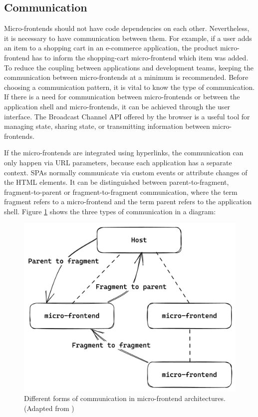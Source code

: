 \subsection{Communication}\label{subsection:background:micro-frontend:communication-patterns}

Micro-frontends should not have code dependencies on each other. Nevertheless, it is necessary to have communication between them. For example, if a user adds an item to a shopping cart in an e-commerce application, the product micro-frontend has to inform the shopping-cart micro-frontend which item was added. To reduce the coupling between applications and development teams, keeping the communication between micro-frontends at a minimum is recommended. Before choosing a communication pattern, it is vital to know the type of communication. If there is a need for communication between micro-frontends or between the application shell and micro-frontends, it can be achieved through the user interface. \cite{book:2020:geers:background:micro-frontends:micro-frontends-in-action} The Broadcast Channel \ac{API} offered by the browser is a useful tool for managing state, sharing state, or transmitting information between micro-frontends. \cite{misc:-:background:micro-frontends:broadcast-channel-api} 

\bigskip

\noindent If the micro-frontends are integrated using hyperlinks, the communication can only happen via \ac{URL} parameters, because each application has a separate context. \acp{SPA} normally communicate via custom events or attribute changes of the \ac{HTML} elements. \cite[100]{book:2020:geers:background:micro-frontends:micro-frontends-in-action} \cite[315-316]{book:2019:farrell:background:micro-frontends:web-components-in-action} It can be distinguished between parent-to-fragment, fragment-to-parent or fragment-to-fragment communication, where the term fragment refers to a micro-frontend and the term parent refers to the application shell. \cite{book:2020:geers:background:micro-frontends:micro-frontends-in-action} Figure \ref{fig:background:micro-frontend:communication:communication-patterns} shows the three types of communication in a diagram:

\ifshowImages
\begin{figure}[H]
  \centering
  \includegraphics[width=0.4\linewidth]{images/background/micro-frontends/communication/communication-patterns.png}
  \caption{Different forms of communication in micro-frontend architectures. (Adapted from \cite[100]{book:2020:geers:background:micro-frontends:micro-frontends-in-action})}\label{fig:background:micro-frontend:communication:communication-patterns}
\end{figure}
\fi

